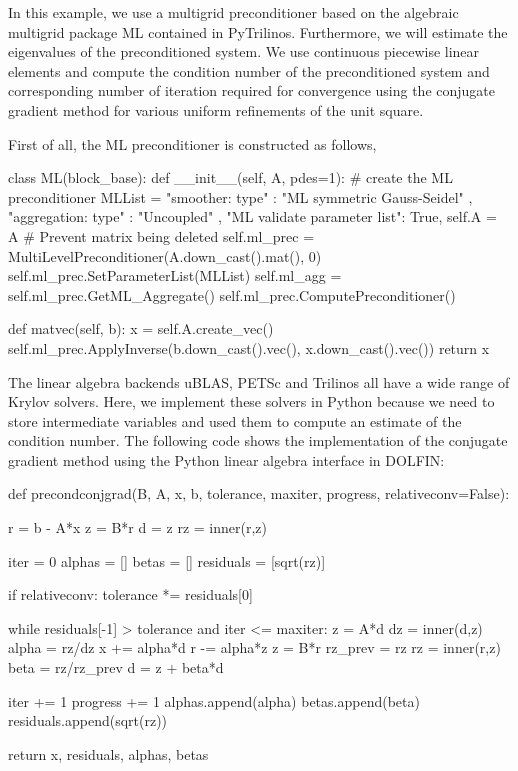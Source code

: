 In this example, we use a multigrid preconditioner based on the
algebraic multigrid package ML contained in
PyTrilinos. Furthermore, we will estimate the
eigenvalues of the preconditioned system. We use continuous piecewise
linear elements and compute the condition number of the preconditioned
system and corresponding number of iteration required for convergence
using the conjugate gradient method
for various uniform refinements of the unit square.

First of all, the ML preconditioner is constructed as follows,
\begin{python}
class ML(block_base):
    def __init__(self, A, pdes=1):
        # create the ML preconditioner
        MLList = {
            "smoother: type"            : "ML symmetric Gauss-Seidel" ,
            "aggregation: type"         : "Uncoupled" ,
            "ML validate parameter list": True,
            }
        self.A = A # Prevent matrix being deleted
        self.ml_prec = MultiLevelPreconditioner(A.down_cast().mat(), 0)
        self.ml_prec.SetParameterList(MLList)
        self.ml_agg = self.ml_prec.GetML_Aggregate()
        self.ml_prec.ComputePreconditioner()

    def matvec(self, b):
        x = self.A.create_vec()
        self.ml_prec.ApplyInverse(b.down_cast().vec(), x.down_cast().vec())
        return x
\end{python}
The linear algebra backends uBLAS, PETSc and Trilinos all have a wide
range of Krylov solvers. Here, we implement these solvers in Python
because we need to store intermediate variables and used them to
compute an estimate of the condition number.  The following code shows
the implementation of the conjugate gradient method using the Python
linear algebra interface in DOLFIN:
\begin{python}
def precondconjgrad(B, A, x, b, tolerance, maxiter, progress, relativeconv=False):

    r = b - A*x
    z = B*r
    d = z
    rz = inner(r,z)

    iter = 0
    alphas = []
    betas = []
    residuals = [sqrt(rz)]

    if relativeconv:
        tolerance *= residuals[0]

    while residuals[-1] > tolerance and iter <= maxiter:
        z = A*d
        dz = inner(d,z)
        alpha = rz/dz
        x += alpha*d
        r -= alpha*z
        z = B*r
        rz_prev = rz
        rz = inner(r,z)
        beta = rz/rz_prev
        d = z + beta*d

        iter += 1
        progress += 1
        alphas.append(alpha)
        betas.append(beta)
        residuals.append(sqrt(rz))

    return x, residuals, alphas, betas
\end{python}
